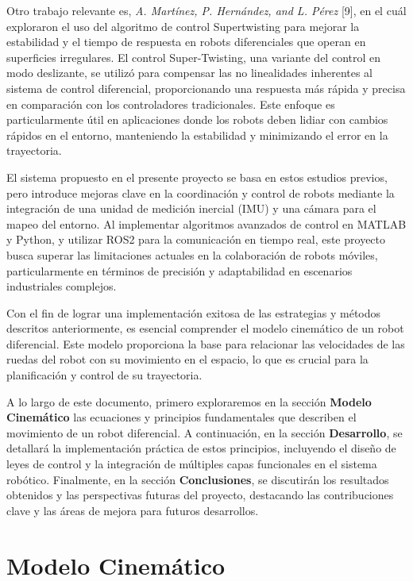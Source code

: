 \documentclass[conference]{IEEEtran}
\begin{document}
Otro trabajo relevante es, \textit{A. Martínez, P. Hernández, and L. Pérez} [9], en el cuál exploraron el uso del algoritmo de control Supertwisting para mejorar la estabilidad y el tiempo de respuesta en robots diferenciales que operan en superficies irregulares. El control Super-Twisting, una variante del control en modo deslizante, se utilizó para compensar las no linealidades inherentes al sistema de control diferencial, proporcionando una respuesta más rápida y precisa en comparación con los controladores tradicionales. Este enfoque es particularmente útil en aplicaciones donde los robots deben lidiar con cambios rápidos en el entorno, manteniendo la estabilidad y minimizando el error en la trayectoria.

El sistema propuesto en el presente proyecto se basa en estos estudios previos, pero introduce mejoras clave en la coordinación y control de robots mediante la integración de una unidad de medición inercial (IMU) y una cámara para el mapeo del entorno. Al implementar algoritmos avanzados de control en MATLAB y Python, y utilizar ROS2 para la comunicación en tiempo real, este proyecto busca superar las limitaciones actuales en la colaboración de robots móviles, particularmente en términos de precisión y adaptabilidad en escenarios industriales complejos.

Con el fin de lograr una implementación exitosa de las estrategias y métodos descritos anteriormente, es esencial comprender el modelo cinemático de un robot diferencial. Este modelo proporciona la base para relacionar las velocidades de las ruedas del robot con su movimiento en el espacio, lo que es crucial para la planificación y control de su trayectoria.

A lo largo de este documento, primero exploraremos en la sección \textbf{Modelo Cinemático} las ecuaciones y principios fundamentales que describen el movimiento de un robot diferencial. A continuación, en la sección \textbf{Desarrollo}, se detallará la implementación práctica de estos principios, incluyendo el diseño de leyes de control y la integración de múltiples capas funcionales en el sistema robótico. Finalmente, en la sección \textbf{Conclusiones}, se discutirán los resultados obtenidos y las perspectivas futuras del proyecto, destacando las contribuciones clave y las áreas de mejora para futuros desarrollos.

\section{Modelo Cinemático}
\end{document}
